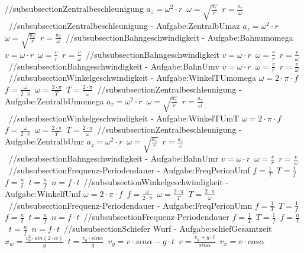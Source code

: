 //subsubsection{Zentralbeschleunigung} 
$ a_{z}  = \omega ^{2} \cdot r $\ 
$ \omega  = \sqrt{\frac{a_{z} }{r}} $\ 
$ r = \frac{a_{z} }{\omega } $\ 
//subsubsection{Zentralbeschleunigung - Aufgabe:ZentralbUmaz} 
$ a_{z}  = \omega ^{2} \cdot r $\ 
$ \omega  = \sqrt{\frac{a_{z} }{r}} $\ 
$ r = \frac{a_{z} }{\omega } $\ 
//subsubsection{Bahngeschwindigkeit - Aufgabe:Bahnumomega} 
$ v = \omega \cdot r $\ 
$ \omega  = \frac{v}{r} $\ 
$ r = \frac{v}{\omega } $\ 
//subsubsection{Bahngeschwindigkeit} 
$ v = \omega \cdot r $\ 
$ \omega  = \frac{v}{r} $\ 
$ r = \frac{v}{\omega } $\ 
//subsubsection{Bahngeschwindigkeit - Aufgabe:BahnUmv} 
$ v = \omega \cdot r $\ 
$ \omega  = \frac{v}{r} $\ 
$ r = \frac{v}{\omega } $\ 
//subsubsection{Winkelgeschwindigkeit - Aufgabe:WinkelTUmomega} 
$ \omega  = 2\cdot \pi \cdot f $\ 
$ f = \frac{\omega }{2\cdot \pi } $\ 
$ \omega  = \frac{2\cdot \pi }{ T} $\ 
$ T = \frac{2\cdot \pi }{ \omega } $\ 
//subsubsection{Zentralbeschleunigung - Aufgabe:ZentralbUmomega} 
$ a_{z}  = \omega ^{2} \cdot r $\ 
$ \omega  = \sqrt{\frac{a_{z} }{r}} $\ 
$ r = \frac{a_{z} }{\omega } $\ 
//subsubsection{Winkelgeschwindigkeit - Aufgabe:WinkelTUmT} 
$ \omega  = 2\cdot \pi \cdot f $\ 
$ f = \frac{\omega }{2\cdot \pi } $\ 
$ \omega  = \frac{2\cdot \pi }{ T} $\ 
$ T = \frac{2\cdot \pi }{ \omega } $\ 
//subsubsection{Zentralbeschleunigung - Aufgabe:ZentralbUmr} 
$ a_{z}  = \omega ^{2} \cdot r $\ 
$ \omega  = \sqrt{\frac{a_{z} }{r}} $\ 
$ r = \frac{a_{z} }{\omega } $\ 
//subsubsection{Bahngeschwindigkeit - Aufgabe:BahnUmr} 
$ v = \omega \cdot r $\ 
$ \omega  = \frac{v}{r} $\ 
$ r = \frac{v}{\omega } $\ 
//subsubsection{Frequenz-Periodendauer - Aufgabe:FreqPerionUmf} 
$ f = \frac{1}{T} $\ 
$ T = \frac{1}{f} $\ 
$ f = \frac{n}{t} $\ 
$ t = \frac{n}{f} $\ 
$ n = f\cdot t $\ 
//subsubsection{Winkelgeschwindigkeit - Aufgabe:WinkelfUmf} 
$ \omega  = 2\cdot \pi \cdot f $\ 
$ f = \frac{\omega }{2\cdot \pi } $\ 
$ \omega  = \frac{2\cdot \pi }{ T} $\ 
$ T = \frac{2\cdot \pi }{ \omega } $\ 
//subsubsection{Frequenz-Periodendauer - Aufgabe:FreqPerionUmn} 
$ f = \frac{1}{T} $\ 
$ T = \frac{1}{f} $\ 
$ f = \frac{n}{t} $\ 
$ t = \frac{n}{f} $\ 
$ n = f\cdot t $\ 
//subsubsection{Frequenz-Periodendauer} 
$ f = \frac{1}{T} $\ 
$ T = \frac{1}{f} $\ 
$ f = \frac{n}{t} $\ 
$ t = \frac{n}{f} $\ 
$ n = f\cdot t $\ 
//subsubsection{Schiefer Wurf  - Aufgabe:schiefGesamtzeit} 
$ x_{w}  = \frac{v_{0} ^{2} \cdot sin(2\cdot \alpha )}{       g} $\ 
$ t =\frac{v_{0} \cdot sin \alpha }{  g} $\ 
$ v_{y}  =  v\cdot sin\alpha - g\cdot t $\ 
$ v= \frac{ v_{y} +g\cdot t}{ sin\alpha } $\ 
$ v_{x}  = v\cdot  cos\alpha $\ 
